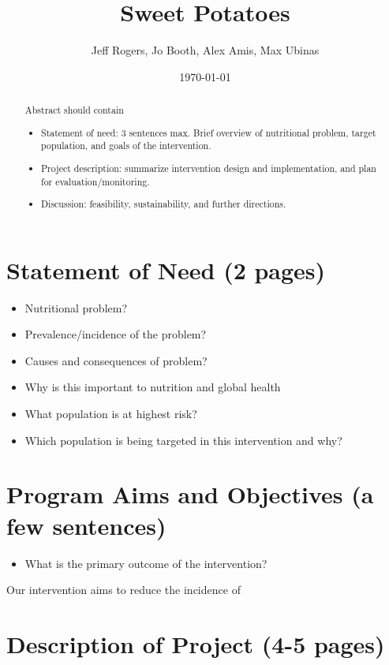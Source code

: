 \documentclass[12pt, letterpaper, draft]{article}
\begin{document}
\title{Sweet Potatoes}
\author{Jeff Rogers, Jo Booth, Alex Amis, Max Ubinas}
\date{\today}
\maketitle


\begin{abstract}
Abstract should contain
\begin{itemize}
    \item Statement of need: 3 sentences max. Brief overview of nutritional
    problem, target population, and goals of the intervention.
    \item Project description: summarize intervention design and implementation,
    and plan for evaluation/monitoring.
    \item Discussion: feasibility, sustainability, and further directions.
\end{itemize}
\end{abstract}

\section{Statement of Need (2 pages)}
\begin{itemize}
    \item Nutritional problem?
    \item Prevalence/incidence of the problem?
    \item Causes and consequences of problem?
    \item Why is this important to nutrition and global health
    \item What population is at highest risk?
    \item Which population is being targeted in this intervention and why?
\end{itemize}

\section{Program Aims and Objectives (a few sentences)}
\begin{itemize}
    \item What is the primary outcome of the intervention?
\end{itemize}

Our intervention aims to reduce the incidence of 

\section{Description of Project (4-5 pages)}
\end{document}
